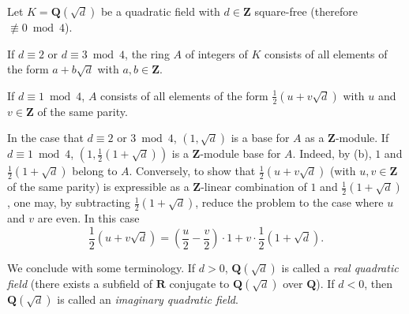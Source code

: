 \begin{theorem}
\label{thm:II.5.1}
Let $K=\mathbf{Q}(\sqrt{d})$ be a quadratic field with $d\in\mathbf{Z}$
square-free (therefore $\not\equiv0\bmod4$).
\begin{alist}
\item If $d\equiv2$ or $d\equiv3\bmod4$, the ring $A$ of integers of $K$
consists of all elements of the form $a+b\sqrt{d}$ with
$a,b\in\mathbf{Z}$.
\item If $d\equiv1\bmod4$, $A$ consists of all elements of the form
$\frac{1}{2}(u+v\sqrt{d})$ with $u$ and $v\in\mathbf{Z}$ of the same parity.
\end{alist}
\end{theorem}

In the case that $d\equiv2$ or $3\bmod4$, $(1,\sqrt{d})$ is a base for $A$
as a $\mathbf{Z}$-module. If $d\equiv1\bmod4$, $(1,\frac{1}{2}(1+\sqrt{d}))$
is a $\mathbf{Z}$-module base for $A$. Indeed, by (b), $1$ and
$\frac{1}{2}(1+\sqrt{d})$ belong to $A$. Conversely, to show that
$\frac{1}{2}(u+v\sqrt{d})$ (with $u,v\in\mathbf{Z}$ of the same parity) is
expressible as a $\mathbf{Z}$-linear combination of $1$ and
$\frac{1}{2}(1+\sqrt{d})$, one may, by subtracting
$\frac{1}{2}(1+\sqrt{d})$, reduce the problem to the case where $u$ and $v$
are even. In this case
\[
\frac{1}{2}(u+v\sqrt{d})=\left(\frac{u}{2}-\frac{v}{2}\right)\cdot1
+v\cdot\frac{1}{2}(1+\sqrt{d}).
\]

We conclude with some terminology. If $d>0$, $\mathbf{Q}(\sqrt{d})$ is
called a \emph{real quadratic field} (there exists a subfield of
$\mathbf{R}$ conjugate to $\mathbf{Q}(\sqrt{d})$ over $\mathbf{Q}$). If
$d<0$, then $\mathbf{Q}(\sqrt{d})$ is called an \emph{imaginary quadratic
field}.


